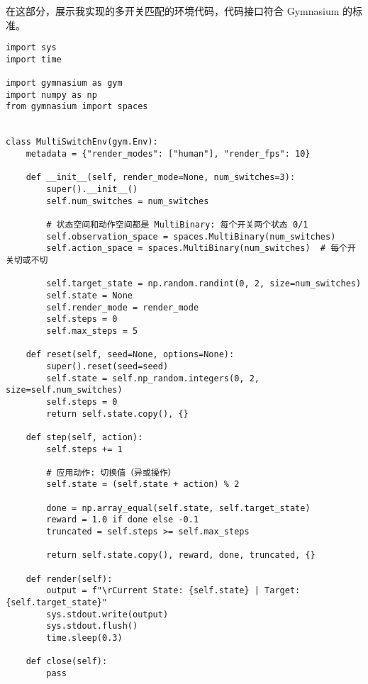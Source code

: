 在这部分，展示我实现的多开关匹配的环境代码，代码接口符合 Gymnasium 的标准。

\begin{verbatim}
import sys
import time

import gymnasium as gym
import numpy as np
from gymnasium import spaces


class MultiSwitchEnv(gym.Env):
    metadata = {"render_modes": ["human"], "render_fps": 10}

    def __init__(self, render_mode=None, num_switches=3):
        super().__init__()
        self.num_switches = num_switches

        # 状态空间和动作空间都是 MultiBinary: 每个开关两个状态 0/1
        self.observation_space = spaces.MultiBinary(num_switches)
        self.action_space = spaces.MultiBinary(num_switches)  # 每个开关切或不切

        self.target_state = np.random.randint(0, 2, size=num_switches)
        self.state = None
        self.render_mode = render_mode
        self.steps = 0
        self.max_steps = 5

    def reset(self, seed=None, options=None):
        super().reset(seed=seed)
        self.state = self.np_random.integers(0, 2, size=self.num_switches)
        self.steps = 0
        return self.state.copy(), {}

    def step(self, action):
        self.steps += 1

        # 应用动作: 切换值（异或操作）
        self.state = (self.state + action) % 2

        done = np.array_equal(self.state, self.target_state)
        reward = 1.0 if done else -0.1
        truncated = self.steps >= self.max_steps

        return self.state.copy(), reward, done, truncated, {}

    def render(self):
        output = f"\rCurrent State: {self.state} | Target: {self.target_state}"
        sys.stdout.write(output)
        sys.stdout.flush()
        time.sleep(0.3)

    def close(self):
        pass
\end{verbatim}

